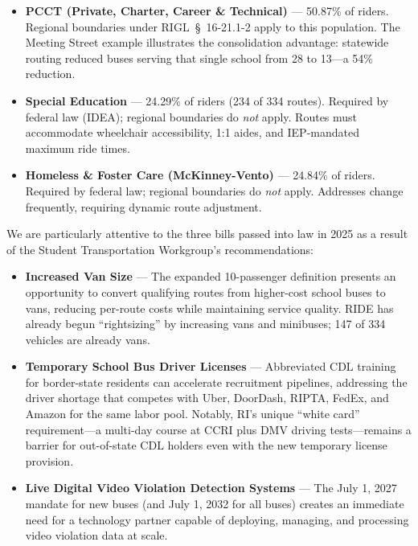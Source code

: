 \begin{itemize}
    \item \textbf{PCCT (Private, Charter, Career \& Technical)} --- 50.87\% of riders. Regional boundaries under RIGL~\S~16-21.1-2 apply to this population. The Meeting Street example illustrates the consolidation advantage: statewide routing reduced buses serving that single school from 28 to 13---a 54\% reduction.
    \item \textbf{Special Education} --- 24.29\% of riders (234 of 334 routes). Required by federal law (IDEA); regional boundaries do \textit{not} apply. Routes must accommodate wheelchair accessibility, 1:1 aides, and IEP-mandated maximum ride times.
    \item \textbf{Homeless \& Foster Care (McKinney-Vento)} --- 24.84\% of riders. Required by federal law; regional boundaries do \textit{not} apply. Addresses change frequently, requiring dynamic route adjustment.
\end{itemize}

\vspace{0.3cm}

We are particularly attentive to the three bills passed into law in 2025 as a result of the Student Transportation Workgroup's recommendations:

\begin{itemize}
    \item \textbf{Increased Van Size} --- The expanded 10-passenger definition presents an opportunity to convert qualifying routes from higher-cost school buses to vans, reducing per-route costs while maintaining service quality. RIDE has already begun ``rightsizing'' by increasing vans and minibuses; 147 of 334 vehicles are already vans.
    \item \textbf{Temporary School Bus Driver Licenses} --- Abbreviated CDL training for border-state residents can accelerate recruitment pipelines, addressing the driver shortage that competes with Uber, DoorDash, RIPTA, FedEx, and Amazon for the same labor pool. Notably, RI's unique ``white card'' requirement---a multi-day course at CCRI plus DMV driving tests---remains a barrier for out-of-state CDL holders even with the new temporary license provision.
    \item \textbf{Live Digital Video Violation Detection Systems} --- The July 1, 2027 mandate for new buses (and July 1, 2032 for all buses) creates an immediate need for a technology partner capable of deploying, managing, and processing video violation data at scale.
\end{itemize}
